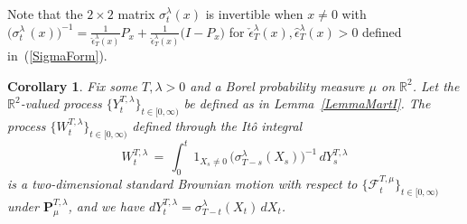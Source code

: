 \documentclass[10pt]{article}
\numberwithin{equation}{section}
\newtheorem{corollary}[theorem]{Corollary}
\theoremstyle{definition}
\newcommand{\R}{{\mathbb R}}
\begin{document}
\begin{appendix}
Note that the $2\times 2$ matrix $\sigma_{t}^{\lambda}(x)$  is invertible when $x\neq 0$ with $ \big(\sigma_{t}^{\lambda}\,(x)\big)^{-1}=\frac{1}{\check{\epsilon}_{T}^{\lambda}(x)}P_x +\frac{1}{\hat{\epsilon}_{T}^{\lambda}(x)}\big(I-P_x\big)$ for $\check{\epsilon}_{T}^{\lambda}(x),\hat{\epsilon}_{T}^{\lambda}(x)>0$ defined  in~(\ref{SigmaForm}).
\begin{corollary}\label{CorollaryMartI}  Fix some $T,\lambda >0$ and a Borel probability measure $\mu$ on $  \R^2$.   Let the $\R^2$-valued process  $\{ Y_{t}^{T,\lambda} \}_{t\in [0,\infty)}$ be defined as in Lemma~\ref{LemmaMartI}.  The process $\{  W^{T,\lambda }_t\}_{t\in [0,\infty)}$ defined through the It\^o integral  
$$W^{T,\lambda }_t\,=\,\int_0^t \, 1_{X_s\neq 0}\, \big(\sigma_{T-s}^{\lambda}(X_s)\big)^{-1} \,dY_{s}^{T,\lambda}      $$
is a two-dimensional standard Brownian motion  with respect to $\{\mathscr{F}_t^{T,\mu}  \}_{t\in [0,\infty)}$ under  $\mathbf{P}^{T,\lambda}_{\mu}$, and we have $dY_{t}^{T,\lambda} =\sigma_{T-t}^{\lambda}(X_t)\,dX_t$.
\end{corollary}


\end{appendix}
\end{document}
